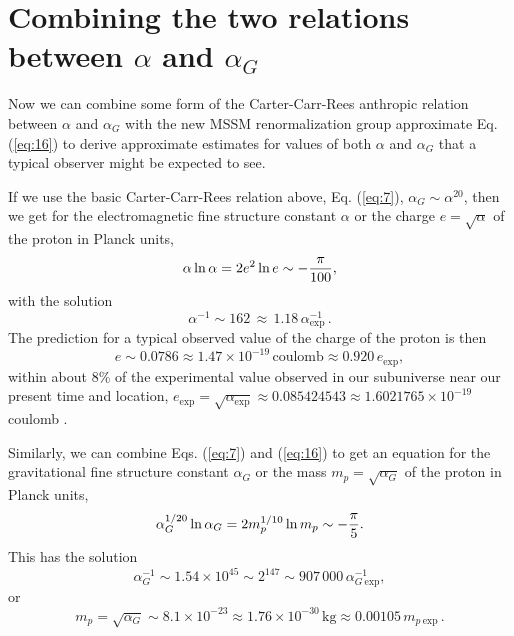 \documentclass[a4paper,12pt]{article}
\begin{document}
\section{Combining the two relations between $\alpha$ and $\alpha_G$}

	Now we can combine some form of the Carter-Carr-Rees
anthropic relation between $\alpha$ and $\alpha_G$
with the new MSSM renormalization group approximate
Eq. (\ref{eq:16}) to derive approximate estimates for values of both
$\alpha$ and $\alpha_G$ that a typical observer might be expected
to see.

	If we use the basic Carter-Carr-Rees relation above,
Eq. (\ref{eq:7}), $\alpha_G \sim \alpha^{20}$,
then we get for the electromagnetic fine structure constant $\alpha$
or the charge $e = \sqrt{\alpha}$ of the proton in Planck units,
 \begin{equation}
 \alpha\ln{\alpha} = 2 e^2\ln{e} \sim -{\pi\over 100},
 \label{eq:21}
 \end{equation}
with the solution
 \begin{equation}
 \alpha^{-1} \sim 162 \, \approx \, 1.18\,\alpha_{\mathrm{exp}}^{-1}\,.
 \label{eq:22}
 \end{equation}
The prediction for a typical observed value of the charge
of the proton is then
 \begin{equation}
 e \sim 0.0786 \approx 1.47 \times 10^{-19} \, \mathrm{coulomb}
   \approx 0.920 \, e_{\mathrm{exp}},
 \label{eq:24}
 \end{equation}
within about 8\% of the experimental value
observed in our subuniverse near our present time and location,
$e_{\mathrm{exp}} = \sqrt{\alpha_{\mathrm{exp}}} \approx 0.085424543
   \approx 1.6021765 \times 10^{-19}$ coulomb \cite{PDG}.
   
	Similarly, we can combine Eqs. (\ref{eq:7}) and (\ref{eq:16})
to get an equation for the gravitational fine structure constant
$\alpha_G$ or the mass $m_p = \sqrt{\alpha_G}$ of the proton
in Planck units,
 \begin{equation}
 \alpha_G^{1/20}\ln{\alpha_G} = 2 m_p^{1/10}\ln{m_p}
                     \sim -{\pi\over 5}.
 \label{eq:25}
 \end{equation}
This has the solution
 \begin{equation}
 \alpha_G^{-1} \sim 1.54 \times 10^{45} \sim 2^{147}
 \sim 907\,000 \, \alpha_{G\ \mathrm{exp}}^{-1},
 \label{eq:26}
 \end{equation}
or
 \begin{equation}
 m_p = \sqrt{\alpha_G} \sim 8.1 \times 10^{-23}
 \approx 1.76 \times 10^{-30} \, \mathrm{kg}
 \approx 0.00105 \, m_{p\ \mathrm{exp}}\,.
 \label{eq:27}
 \end{equation}
\end{document}
